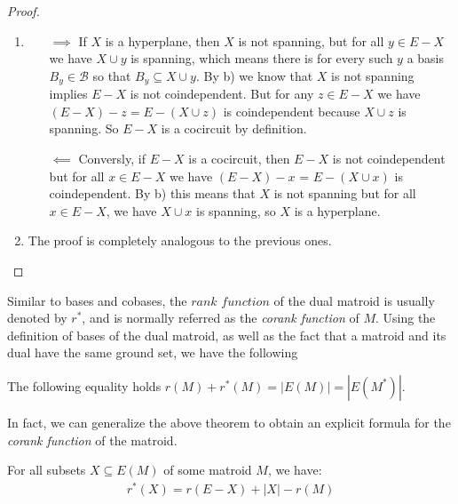 \begin{proof}
\begin{enumerate}
    \item  \begin{enumerate}
        \item[$\implies$] If $X$ is a hyperplane, then $X$ is not spanning, but for all $y \in E - X$ we have $X \cup y$ is spanning, which means there is for every such $y$ a basis $B_y \in \mathcal{B}$ so that $B_y \subseteq X \cup y $. By b) we know that $X$ is not spanning implies $E - X$ is not coindependent. But for any $z \in E - X$ we have $(E-X)-z = E - (X \cup z)$ is coindependent because $X \cup z$ is spanning. So $E - X$ is a cocircuit by definition.
        \item[$\impliedby$] Conversly, if $E - X$ is a cocircuit, then $E-X$ is not coindependent but for all $x \in E - X$ we have $(E - X) - x$ = $E - (X \cup x)$ is coindependent. By b) this means that $X$ is not spanning but for all $x \in E-X$, we have $X \cup x$ is spanning, so $X$ is a hyperplane.
    \end{enumerate}

\item The proof is completely analogous to the previous ones. \qedhere
    \end{enumerate}
\end{proof}

Similar to bases and cobases, the $rank$ $ function$ of the dual matroid is usually denoted by $r^*$, and is normally referred as the \textit{corank function} of $M$. Using the definition of bases of the dual matroid, as well as the fact that a matroid and its dual have the same ground set, we have the following

\begin{theorem}\label{RankAndCorankEquation}
  The following equality holds  $r(M) + r^*(M) = |E(M)|=|E(M^*)|$.
\end{theorem}

In fact, we can generalize the above theorem to obtain an explicit formula for the \textit{corank function} of the matroid. 

\begin{theorem}\label{rankdualequation}
    For all subsets $X \subseteq E(M)$ of some matroid $M$, we have:
    \begin{align*}
    r^*(X)=r(E-X)+|X|-r(M)
    \end{align*}
\end{theorem}

